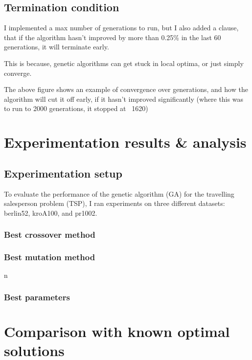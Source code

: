 \documentclass[11pt]{scrartcl} %
\begin{document}
\subsection{Termination condition}
I implemented a max number of generations to run, but I also added a clause, that if the algorithm hasn't improved by more than 0.25\% in the last 60 generations, it will terminate early.

This is because, genetic algorithms can get stuck in local optima, or just simply converge.


The above figure shows an example of convergence over generations, and how the algorithm will cut it off early, if it hasn't improved significantly (where this was to run to 2000 generations, it stopped at ~1620)

\section{Experimentation results \& analysis}

\subsection{Experimentation setup}
To evaluate the performance of the genetic algorithm (GA) for the travelling salesperson problem (TSP), I ran experiments on three different datasets: berlin52, kroA100, and pr1002.


\subsubsection{Best crossover method}

\subsubsection{Best mutation method}
n 
\subsubsection{Best parameters}

\section{Comparison with known optimal solutions}
\label{Comparison with known optimal solutions}
\end{document}
